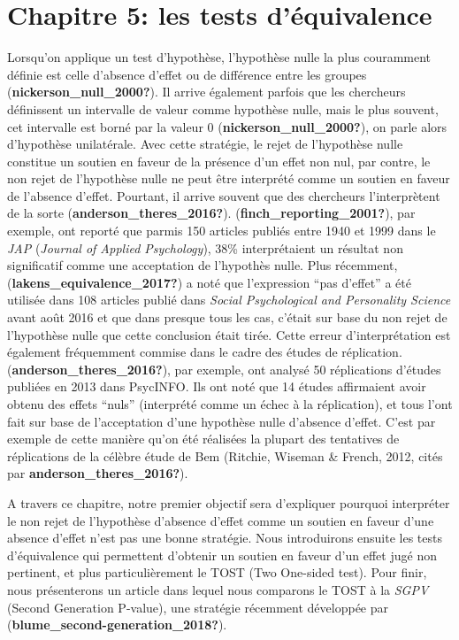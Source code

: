 \documentclass[
  english,
  man]{apa6}
\author{\phantom{0}}
\date{}
\affiliation{\phantom{0}}
\begin{document}
\hypertarget{chapitre-5-les-tests-duxe9quivalence}{%
\section{Chapitre 5: les tests d'équivalence}\label{chapitre-5-les-tests-duxe9quivalence}}

Lorsqu'on applique un test d'hypothèse, l'hypothèse nulle la plus couramment définie est celle d'absence d'effet ou de différence entre les groupes (\textbf{nickerson\_null\_2000?}). Il arrive également parfois que les chercheurs définissent un intervalle de valeur comme hypothèse nulle, mais le plus souvent, cet intervalle est borné par la valeur 0 (\textbf{nickerson\_null\_2000?}), on parle alors d'hypothèse unilatérale. Avec cette stratégie, le rejet de l'hypothèse nulle constitue un soutien en faveur de la présence d'un effet non nul, par contre, le non rejet de l'hypothèse nulle ne peut être interprété comme un soutien en faveur de l'absence d'effet. Pourtant, il arrive souvent que des chercheurs l'interprètent de la sorte (\textbf{anderson\_theres\_2016?}). (\textbf{finch\_reporting\_2001?}), par exemple, ont reporté que parmis 150 articles publiés entre 1940 et 1999 dans le \emph{JAP} (\emph{Journal of Applied Psychology}), 38\% interprétaient un résultat non significatif comme une acceptation de l'hypothès nulle. Plus récemment, (\textbf{lakens\_equivalence\_2017?}) a noté que l'expression ``pas d'effet'' a été utilisée dans 108 articles publié dans \emph{Social Psychological and Personality Science} avant août 2016 et que dans presque tous les cas, c'était sur base du non rejet de l'hypothèse nulle que cette conclusion était tirée. Cette erreur d'interprétation est également fréquemment commise dans le cadre des études de réplication. (\textbf{anderson\_theres\_2016?}), par exemple, ont analysé 50 réplications d'études publiées en 2013 dans PsycINFO. Ils ont noté que 14 études affirmaient avoir obtenu des effets ``nuls'' (interprété comme un échec à la réplication), et tous l'ont fait sur base de l'acceptation d'une hypothèse nulle d'absence d'effet. C'est par exemple de cette manière qu'on été réalisées la plupart des tentatives de réplications de la célèbre étude de Bem (Ritchie, Wiseman \& French, 2012, cités par \textbf{anderson\_theres\_2016?}).

A travers ce chapitre, notre premier objectif sera d'expliquer pourquoi interpréter le non rejet de l'hypothèse d'absence d'effet comme un soutien en faveur d'une absence d'effet n'est pas une bonne stratégie. Nous introduirons ensuite les tests d'équivalence qui permettent d'obtenir un soutien en faveur d'un effet jugé non pertinent, et plus particulièrement le TOST (Two One-sided test). Pour finir, nous présenterons un article dans lequel nous comparons le TOST à la \emph{SGPV} (Second Generation P-value), une stratégie récemment développée par (\textbf{blume\_second-generation\_2018?}).
\end{document}
